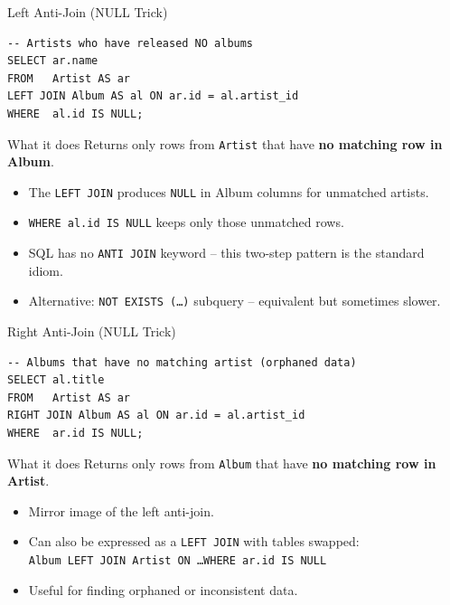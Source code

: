 \begin{frame}[fragile]{Left Anti-Join (NULL Trick)}
  \begin{center}\end{center}

  \begin{lstlisting}[style=sqlstyle]
-- Artists who have released NO albums
SELECT ar.name
FROM   Artist AS ar
LEFT JOIN Album AS al ON ar.id = al.artist_id
WHERE  al.id IS NULL;
  \end{lstlisting}

  \begin{block}{What it does}
    Returns only rows from \texttt{Artist} that have \textbf{no matching row in Album}.
  \end{block}

  \begin{itemize}
    \item The \texttt{LEFT JOIN} produces \texttt{NULL} in Album columns for unmatched artists.
    \item \texttt{WHERE al.id IS NULL} keeps only those unmatched rows.
    \item SQL has no \texttt{ANTI JOIN} keyword -- this two-step pattern is the standard idiom.
    \item Alternative: \texttt{NOT EXISTS (\ldots)} subquery -- equivalent but sometimes slower.
  \end{itemize}
\end{frame}

\begin{frame}[fragile]{Right Anti-Join (NULL Trick)}
  \begin{center}\end{center}

  \begin{lstlisting}[style=sqlstyle]
-- Albums that have no matching artist (orphaned data)
SELECT al.title
FROM   Artist AS ar
RIGHT JOIN Album AS al ON ar.id = al.artist_id
WHERE  ar.id IS NULL;
  \end{lstlisting}

  \begin{block}{What it does}
    Returns only rows from \texttt{Album} that have \textbf{no matching row in Artist}.
  \end{block}

  \begin{itemize}
    \item Mirror image of the left anti-join.
    \item Can also be expressed as a \texttt{LEFT JOIN} with tables swapped:\\
          \texttt{Album LEFT JOIN Artist ON \ldots WHERE ar.id IS NULL}
    \item Useful for finding orphaned or inconsistent data.
  \end{itemize}
\end{frame}

